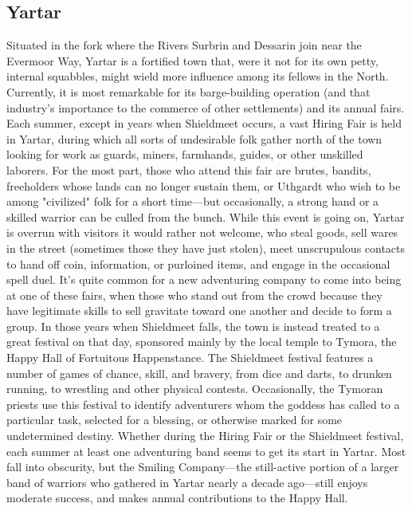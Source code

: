 \documentclass[10pt,a4paper,twoside,twocolumn,openany,bg=print,nodeprecatedcode]{dndbook}
\begin{document}
\subsection{Yartar}
Situated in the fork where the Rivers Surbrin and Dessarin join near the Evermoor Way, Yartar is a fortified town that, were it not for its own petty, internal squabbles, might wield more influence among its fellows in the North. Currently, it is most remarkable for its barge-building operation (and that industry's importance to the commerce of other settlements) and its annual fairs.
Each summer, except in years when Shieldmeet occurs, a vast Hiring Fair is held in Yartar, during which all sorts of undesirable folk gather north of the town looking for work as guards, miners, farmhands, guides, or other unskilled laborers. For the most part, those who attend this fair are brutes, bandits, freeholders whose lands can no longer sustain them, or Uthgardt who wish to be among "civilized" folk for a short time—but occasionally, a strong hand or a skilled warrior can be culled from the bunch. While this event is going on, Yartar is overrun with visitors it would rather not welcome, who steal goods, sell wares in the street (sometimes those they have just stolen), meet unscrupulous contacts to hand off coin, information, or purloined items, and engage in the occasional spell duel. It's quite common for a new adventuring company to come into being at one of these fairs, when those who stand out from the crowd because they have legitimate skills to sell gravitate toward one another and decide to form a group.
In those years when Shieldmeet falls, the town is instead treated to a great festival on that day, sponsored mainly by the local temple to Tymora, the Happy Hall of Fortuitous Happenstance. The Shieldmeet festival features a number of games of chance, skill, and bravery, from dice and darts, to drunken running, to wrestling and other physical contests. Occasionally, the Tymoran priests use this festival to identify adventurers whom the goddess has called to a particular task, selected for a blessing, or otherwise marked for some undetermined destiny.
Whether during the Hiring Fair or the Shieldmeet festival, each summer at least one adventuring band seems to get its start in Yartar. Most fall into obscurity, but the Smiling Company—the still-active portion of a larger band of warriors who gathered in Yartar nearly a decade ago—still enjoys moderate success, and makes annual contributions to the Happy Hall.
\end{document}
